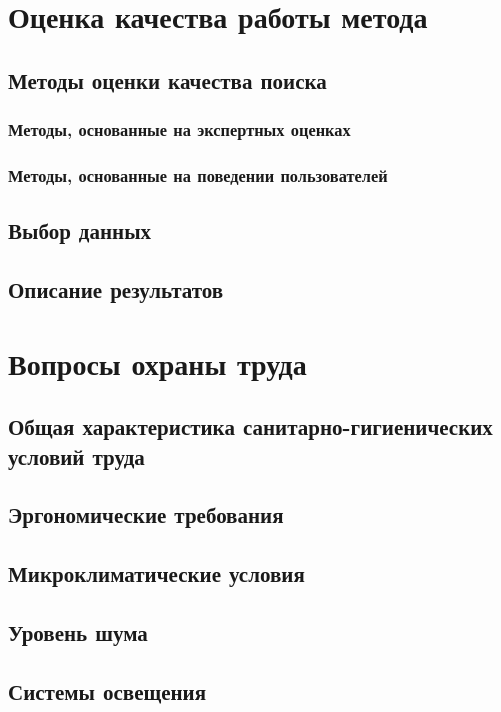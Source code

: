 \documentclass[12pt,a4paper]{report}
\begin{document}
\chapter{Оценка качества работы метода}

\section{Методы оценки качества поиска}
\subsection{Методы, основанные на экспертных оценках}
\subsection{Методы, основанные на поведении пользователей}

\section{Выбор данных}
\section{Описание результатов}

\chapter{Вопросы охраны труда}

\section{Общая характеристика санитарно-гигиенических условий труда}
\section{Эргономические требования}
\section{Микроклиматические условия}
\section{Уровень шума}
\section{Системы освещения}
\end{document}
